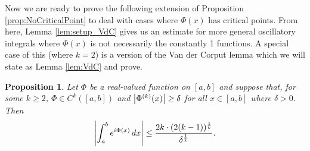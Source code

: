 \documentclass[11pt, letter]{book}
\newtheorem{proposition}[theorem]{Proposition}
\newcommand{\f}[2]{\frac{#1}{#2}}
\begin{document}
\noindent Now we are ready to prove the following extension of Proposition \ref{prop:NoCriticalPoint} to deal with cases where $\Phi(x)$ has critical points. From here, Lemma \ref{lem:setup_VdC} gives us an estimate for more general oscillatory integrals where $\Phi(x)$ is not necessarily the constantly 1 functions. A special case of this (where $k=2$) is a version of the Van der Corput lemma which we will state as Lemma \ref{lem:VdC} and prove.


\begin{framed}
\begin{proposition}\label{prop:NoPsi}
Let $\Phi$ be a real-valued function on $[a,b]$ and suppose that, for some $k\geq 2$, $\Phi\in C^k([a,b])$ and $\abs{\Phi^{(k)}(x)} \geq \delta$ for all $x\in [a,b]$ where $\delta>0$. Then
\begin{equation*}
    \abs{\int_a^b e^{i \Phi(x)} \,dx} \leq \f{2k\cdot (2(k-1))^{\f{1}{k}}}{\delta^{\f{1}{k}}}.
\end{equation*}
\end{proposition}
\end{framed}
\end{document}

